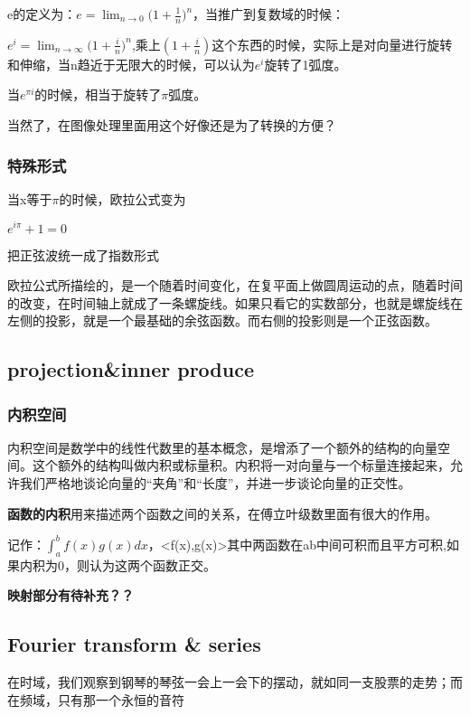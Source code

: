 \documentclass[UTF8]{ctexart}
\begin{document}
e的定义为：$e=\lim_{n\rightarrow 0}(1+\displaystyle{\frac{1}{n})^{n}}$，当推广到复数域的时候：

$e^{i}=\lim_{n\rightarrow \infty}(1+\displaystyle{\frac{i}{n})^{n}}$,乘上$(1+\displaystyle{\frac{i}{n}})$这个东西的时候，实际上是对向量进行旋转和伸缩，当n趋近于无限大的时候，可以认为$e^{i}$旋转了1弧度。

当$e^{\pi i}$的时候，相当于旋转了$\pi$弧度。

当然了，在图像处理里面用这个好像还是为了转换的方便？

\subsubsection*{特殊形式}
当x等于$\pi$的时候，欧拉公式变为

$e^{i\pi} + 1 = 0$

把正弦波统一成了指数形式

欧拉公式所描绘的，是一个随着时间变化，在复平面上做圆周运动的点，随着时间的改变，在时间轴上就成了一条螺旋线。如果只看它的实数部分，也就是螺旋线在左侧的投影，就是一个最基础的余弦函数。而右侧的投影则是一个正弦函数。

\subsection*{projection&inner produce}
\subsubsection*{内积空间}
内积空间是数学中的线性代数里的基本概念，是增添了一个额外的结构的向量空间。这个额外的结构叫做内积或标量积。内积将一对向量与一个标量连接起来，允许我们严格地谈论向量的“夹角”和“长度”，并进一步谈论向量的正交性。

\textbf{函数的内积}用来描述两个函数之间的关系，在傅立叶级数里面有很大的作用。

记作：$ \int_{a}^{b} f(x)g(x)dx$，<f(x),g(x)>其中两函数在ab中间可积而且平方可积,如果内积为0，则认为这两个函数正交。

\textbf{映射部分有待补充？？}



\subsection*{Fourier transform & series}

在时域，我们观察到钢琴的琴弦一会上一会下的摆动，就如同一支股票的走势；而在频域，只有那一个永恒的音符
\end{document}
